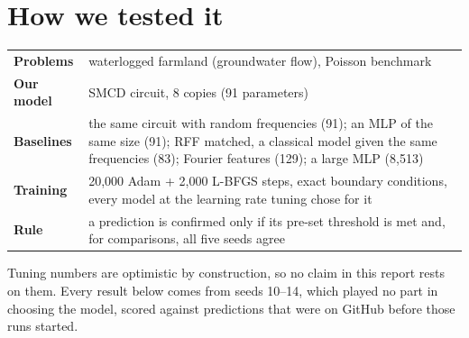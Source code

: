 \documentclass[11pt,a4paper]{article}
\newcommand{\newpart}{\clearpage}
\begin{document}
\section{How we tested it}
\begin{center}
\end{center}

\begin{center}
\small
\begin{tabularx}{\linewidth}{>{\bfseries}l X}
\toprule
Problems & waterlogged farmland (groundwater flow), Poisson benchmark \\
Our model & SMCD circuit, 8 copies (91 parameters) \\
Baselines & the same circuit with random frequencies (91); an MLP of the same size (91);
  RFF matched, a classical model given the same frequencies (83); Fourier features (129);
  a large MLP (8{,}513) \\
Training & 20{,}000 Adam + 2{,}000 L-BFGS steps, exact boundary conditions, every model
  at the learning rate tuning chose for it \\
Rule & a prediction is confirmed only if its pre-set threshold is met and, for
  comparisons, all five seeds agree \\
\bottomrule
\end{tabularx}
\end{center}

Tuning numbers are optimistic by construction, so no claim in this report rests on them.
Every result below comes from seeds 10--14, which played no part in choosing the model,
scored against predictions that were on GitHub before those runs started.

\newpart
\end{document}
